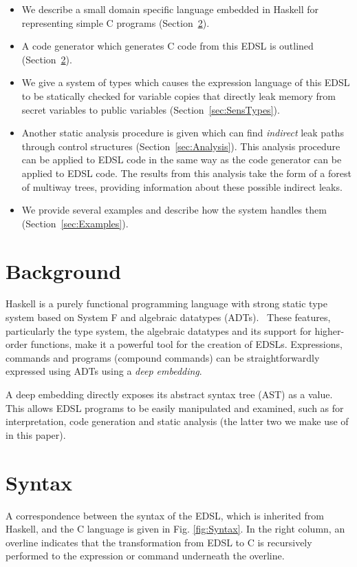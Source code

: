 \documentclass[10pt, conference]{IEEEtran}
\begin{document}
\begin{itemize}
\item We describe a small domain specific language embedded in Haskell for representing
  simple C programs (Section~\ref{sec:Syntax}).
\item A code generator which generates C code from this EDSL is outlined
  (Section~\ref{sec:Syntax}).
\item We give a system of types which causes the expression language of this
  EDSL to be statically checked for variable copies that directly leak memory
  from secret variables to public variables (Section~\ref{sec:SensTypes}).
\item Another static analysis procedure is given which can find \textit{indirect}
  leak paths through control structures (Section~\ref{sec:Analysis}). This analysis
  procedure can be applied to EDSL code in the same way as the code generator
  can be applied to EDSL code. The results from this analysis take the form
  of a forest of multiway trees, providing information about these possible
  indirect leaks.
\item We provide several examples and describe how the system handles them
  (Section~\ref{sec:Examples}).
\end{itemize}

\section{Background}

Haskell is a purely functional programming language with strong static type
system based on System F and algebraic datatypes (ADTs).~\cite{HistoryOfHaskell}
These features, particularly the type system, the algebraic datatypes and its
support for higher-order functions, make it a powerful tool for the creation of
EDSLs. Expressions, commands and programs (compound commands) can be
straightforwardly expressed using ADTs using a \textit{deep
embedding}.~\cite{DeepAndShallow}

A deep embedding directly exposes its abstract syntax tree (AST) as a value.
This allows EDSL programs to be easily manipulated and examined, such as for
interpretation, code generation and static analysis (the latter two we make use
of in this paper).

\section{Syntax}
\label{sec:Syntax}
A correspondence between the syntax of the EDSL, which is inherited from
Haskell, and the C language is given in Fig. \ref{fig:Syntax}. In the right column, an
overline indicates that the transformation from EDSL to C is recursively
performed to the expression or command underneath the overline.
\end{document}
